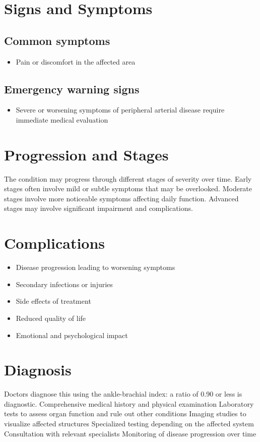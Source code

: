 \section{Signs and Symptoms}

\subsection{Common symptoms}
\begin{itemize}[noitemsep]
  \item Pain or discomfort in the affected area
  \end{itemize}

\subsection{Emergency warning signs}
\begin{itemize}[noitemsep]
  \item Severe or worsening symptoms of peripheral arterial disease require immediate medical evaluation
\end{itemize}
\section{Progression and Stages}
The condition may progress through different stages of severity over time. Early stages often involve mild or subtle symptoms that may be overlooked. Moderate stages involve more noticeable symptoms affecting daily function. Advanced stages may involve significant impairment and complications.
\section{Complications}
\begin{itemize}[noitemsep]
  \item Disease progression leading to worsening symptoms
  \item Secondary infections or injuries
  \item Side effects of treatment
  \item Reduced quality of life
  \item Emotional and psychological impact
\end{itemize}
\section{Diagnosis}
Doctors diagnose this using the ankle-brachial index: a ratio of 0.90 or less is diagnostic. Comprehensive medical history and physical examination Laboratory tests to assess organ function and rule out other conditions Imaging studies to visualize affected structures Specialized testing depending on the affected system Consultation with relevant specialists Monitoring of disease progression over time

